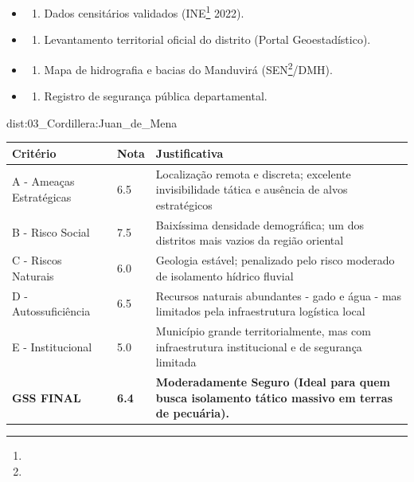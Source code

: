 {\begin{itemize}
\tightlist
\item
  \begin{enumerate}
  \def\labelenumi{\arabic{enumi})}
  \tightlist
  \item
    Dados censitários validados (INE\footnote{\fineINE} 2022).
  \end{enumerate}
\item
  \begin{enumerate}
  \def\labelenumi{\arabic{enumi})}
  \setcounter{enumi}{1}
  \tightlist
  \item
    Levantamento territorial oficial do distrito (Portal
    Geoestadístico).
  \end{enumerate}
\item
  \begin{enumerate}
  \def\labelenumi{\arabic{enumi})}
  \setcounter{enumi}{2}
  \tightlist
  \item
    Mapa de hidrografia e bacias do Manduvirá (SEN\footnote{\fineSEN}/\allowbreak DMH).
  \end{enumerate}
\item
  \begin{enumerate}
  \def\labelenumi{\arabic{enumi})}
  \setcounter{enumi}{3}
  \tightlist
  \item
    Registro de segurança pública departamental.
  \end{enumerate}
\end{itemize}}{dist:03_Cordillera:Juan_de_Mena}
\begin{table}[ht!]
\small \begin{tabular}{p{3.0cm}p{0.8cm}p{6.0cm}} \toprule
\textbf{Critério} & \textbf{Nota} & \textbf{Justificativa} \\ \midrule
A - Ameaças Estratégicas & 6.5 & Localização remota e discreta; excelente invisibilidade tática e ausência de alvos estratégicos \\
B - Risco Social & 7.5 & Baixíssima densidade demográfica; um dos distritos mais vazios da região oriental \\
C - Riscos Naturais & 6.0 & Geologia estável; penalizado pelo risco moderado de isolamento hídrico fluvial \\
D - Autossuficiência & 6.5 & Recursos naturais abundantes - gado e água - mas limitados pela infraestrutura logística local \\
E - Institucional & 5.0 & Município grande territorialmente, mas com infraestrutura institucional e de segurança limitada \\
\midrule \textbf{GSS FINAL} & \textbf{6.4} & \textbf{Moderadamente Seguro (Ideal para quem busca isolamento tático massivo em terras de pecuária).} \\ \bottomrule \end{tabular}
\end{table}
